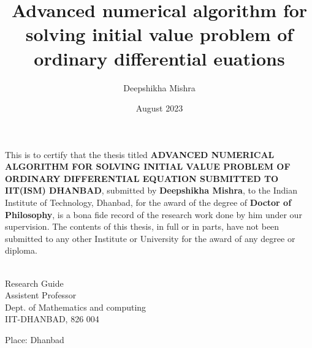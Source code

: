 \documentclass[PhD]{iitmdiss}
\begin{document}

\title{Advanced numerical algorithm for solving initial value problem of ordinary differential euations}

\author{Deepshikha Mishra}

\date{August 2023}

\maketitle
\certificate

\vspace*{0.5in}

\noindent This is to certify that the thesis titled {\bf ADVANCED NUMERICAL ALGORITHM FOR SOLVING INITIAL VALUE PROBLEM OF ORDINARY DIFFERENTIAL EQUATION SUBMITTED TO IIT(ISM) DHANBAD}, submitted by {\bf Deepshikha Mishra}, 
  to the Indian Institute of Technology, Dhanbad, for
the award of the degree of {\bf Doctor of Philosophy}, is a bona fide
record of the research work done by him under our supervision.  The
contents of this thesis, in full or in parts, have not been submitted
to any other Institute or University for the award of any degree or
diploma.

\vspace*{1.5in}

\begin{singlespacing}
\hspace*{-0.25in}
\parbox{2.5in}{
 \\
\noindent Research Guide \\ 
\noindent Assistent Professor \\
\noindent Dept. of Mathematics and computing\\
\noindent IIT-DHANBAD, 826 004 \\
} 
\hspace*{1.0in} 
\end{singlespacing}
\vspace*{0.25in}
\noindent Place: Dhanbad
\end{document}
